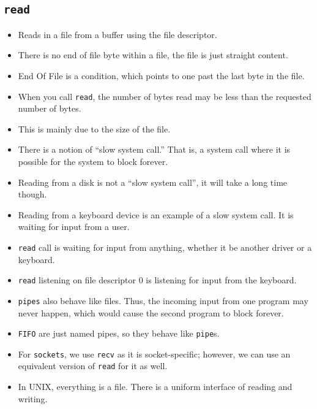 \documentclass[]{article}
\newcommand{\code}{\texttt}
\begin{document}
\subsection{\code{read}}
\begin{itemize}
\item Reads in a file from a buffer using the file descriptor.
\item There is no end of file byte within a file, the file is just straight
content.
\item End Of File is a condition, which points to one past the last byte in the
file.
\item When you call \code{read}, the number of bytes read may be less than the
requested number of bytes.
\item This is mainly due to the size of the file.
\item There is a notion of ``slow system call.'' That is, a system call where it
is possible for the system to block forever.
\item Reading from a disk is not a ``slow system call'', it will take a long
time though.
\item Reading from a keyboard device is an example of a slow system call. It is
waiting for input from a user.
\item \code{read} call is waiting for input from anything, whether it be another
driver or a keyboard.
\item \code{read} listening on file descriptor 0 is listening for input from the
keyboard.
\item \code{pipes} also behave like files. Thus, the incoming input from one
program may never happen, which would cause the second program to block forever.
\item \code{FIFO} are just named pipes, so they behave like \code{pipe}s.
\item For \code{sockets}, we use \code{recv} as it is socket-specific; however,
we can use an equivalent version of \code{read} for it as well.
\item In UNIX, everything is a file. There is a uniform interface of reading and
writing.
\end{itemize}
\end{document}
